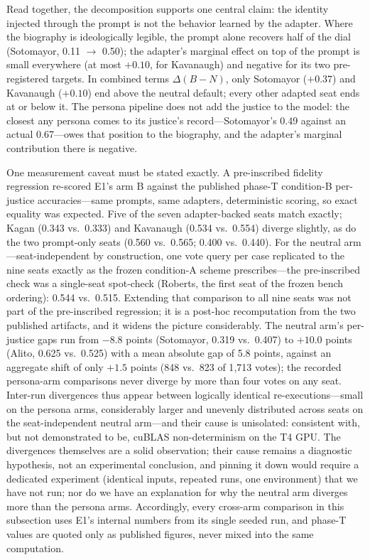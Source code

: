 Read together, the decomposition supports one central claim: the
identity injected through the prompt is not the behavior learned by
the adapter. Where the biography is ideologically legible, the prompt
alone recovers half of the dial (Sotomayor, 0.11 $\to$ 0.50); the
adapter's marginal effect on top of the prompt is small everywhere
(at most $+0.10$, for Kavanaugh) and negative for its two
pre-registered targets. In combined terms $\Delta(B-N)$, only
Sotomayor ($+0.37$) and Kavanaugh ($+0.10$) end above the neutral
default; every other adapted seat ends at or below it. The persona
pipeline does not add the justice to the model: the closest any persona
comes to its justice's record---Sotomayor's 0.49 against an actual
0.67---owes that position to the biography, and the adapter's marginal
contribution there is negative.

One measurement caveat must be stated exactly. A pre-inscribed
fidelity regression re-scored E1's arm B against the published
phase-T condition-B per-justice accuracies---same prompts, same
adapters, deterministic scoring, so exact equality was expected.
Five of the seven adapter-backed seats match exactly; Kagan (0.343
vs.\ 0.333) and Kavanaugh (0.534 vs.\ 0.554) diverge slightly, as do
the two prompt-only seats (0.560 vs.\ 0.565; 0.400 vs.\ 0.440). For
the neutral arm---seat-independent by construction, one vote query
per case replicated to the nine seats exactly as the frozen
condition-A scheme prescribes---the pre-inscribed check was a
single-seat spot-check (Roberts, the first seat of the frozen bench
ordering): 0.544 vs.\ 0.515. Extending that comparison to all nine
seats was not part of the pre-inscribed regression; it is a post-hoc
recomputation from the two published artifacts, and it widens the
picture considerably. The neutral arm's per-justice gaps run from
$-8.8$ points (Sotomayor, 0.319 vs.\ 0.407) to $+10.0$ points
(Alito, 0.625 vs.\ 0.525) with a mean absolute gap of 5.8 points,
against an aggregate shift of only $+1.5$ points (848 vs.\ 823 of
1{,}713 votes); the recorded persona-arm comparisons never diverge
by more than four votes on any seat. Inter-run divergences thus
appear between logically identical re-executions---small on the
persona arms, considerably larger and unevenly distributed across
seats on the seat-independent neutral arm---and their cause is
unisolated: consistent with, but not demonstrated to be, cuBLAS
non-determinism on the T4 GPU. The divergences themselves are a
solid observation; their cause remains a diagnostic hypothesis, not
an experimental conclusion, and pinning it down would require a
dedicated experiment (identical inputs, repeated runs, one
environment) that we have not run; nor do we have an explanation
for why the neutral arm diverges more than the persona arms.
Accordingly, every cross-arm comparison in this subsection uses
E1's internal numbers from its single seeded run, and phase-T
values are quoted only as published figures, never mixed into the
same computation.

